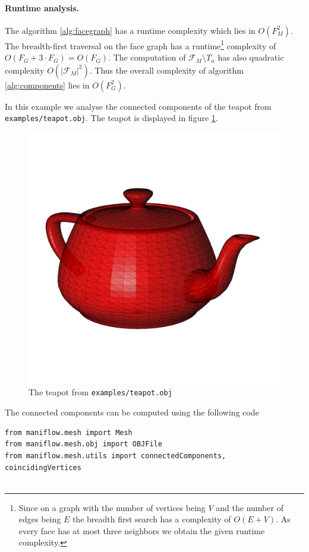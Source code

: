 \paragraph{Runtime analysis.} The algorithm \ref{alg:facegraph} has a runtime complexity which lies in $O(F_M^2)$. The breadth-first traversal on the face graph has a runtime\footnote{Since on a graph with the number of vertices being $V$ and the number of edges being $E$ the breadth first search has a complexity of $O(E + V)$. As every face has at most three neighbors we obtain the given runtime complexity.} complexity of $O(F_G + 3\cdot F_G) = O(F_G)$. The computation of $\mathcal{F}_M\setminus T_n$ has also quadratic complexity $O(\vert\mathcal{F}_M\vert^2)$. Thus the overall complexity of algorithm \ref{alg:components} lies in $O(F_G^2)$.
\begin{ex}
    In this example we analyse the connected components of the teapot from \texttt{examples/teapot.obj}. The teapot is displayed in figure \ref{fig:teapot}.
    \begin{figure}[h]
        \centering
        \includegraphics[scale=0.15]{img/teapot.png}
        \caption{The teapot from \texttt{examples/teapot.obj}}
        \label{fig:teapot}
    \end{figure}
    \newline\noindent The connected components can be computed using the following code
    \begin{lstlisting}
from maniflow.mesh import Mesh
from maniflow.mesh.obj import OBJFile
from maniflow.mesh.utils import connectedComponents, coincidingVertices


\end{lstlisting}
\end{ex}
